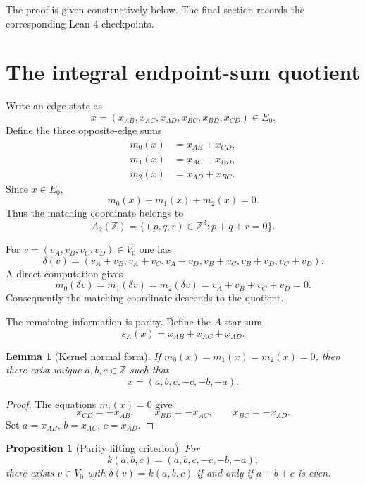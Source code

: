 \documentclass[11pt]{amsart}
\newtheorem{proposition}[theorem]{Proposition}
\newtheorem{lemma}[theorem]{Lemma}
\theoremstyle{definition}
\theoremstyle{remark}
\newcommand{\Z}{\mathbb Z}
\begin{document}
The proof is given constructively below. The final section records the corresponding Lean 4 checkpoints.

\section{The integral endpoint-sum quotient}

Write an edge state as
\[
x=(x_{AB},x_{AC},x_{AD},x_{BC},x_{BD},x_{CD})\in E_0.
\]
Define the three opposite-edge sums
\begin{equation}\label{eq:matching}
\begin{aligned}
m_0(x)&=x_{AB}+x_{CD},\\
m_1(x)&=x_{AC}+x_{BD},\\
m_2(x)&=x_{AD}+x_{BC}.
\end{aligned}
\end{equation}
Since $x\in E_0$,
\begin{equation}\label{eq:a2sum}
m_0(x)+m_1(x)+m_2(x)=0.
\end{equation}
Thus the matching coordinate belongs to
\[
A_2(\Z)=\{(p,q,r)\in\Z^3:p+q+r=0\}.
\]

For $v=(v_A,v_B,v_C,v_D)\in V_0$ one has
\[
\delta(v)=(v_A+v_B,v_A+v_C,v_A+v_D,v_B+v_C,v_B+v_D,v_C+v_D).
\]
A direct computation gives
\begin{equation}\label{eq:deltaMatching}
m_0(\delta v)=m_1(\delta v)=m_2(\delta v)=v_A+v_B+v_C+v_D=0.
\end{equation}
Consequently the matching coordinate descends to the quotient.

The remaining information is parity. Define the $A$-star sum
\[
s_A(x)=x_{AB}+x_{AC}+x_{AD}.
\]

\begin{lemma}[Kernel normal form]\label{lem:kernel-normal}
If $m_0(x)=m_1(x)=m_2(x)=0$, then there exist unique $a,b,c\in\Z$ such that
\[
x=(a,b,c,-c,-b,-a).
\]
\end{lemma}

\begin{proof}
The equations $m_i(x)=0$ give
\[
x_{CD}=-x_{AB},\qquad x_{BD}=-x_{AC},\qquad x_{BC}=-x_{AD}.
\]
Set $a=x_{AB}$, $b=x_{AC}$, $c=x_{AD}$.
\end{proof}

\begin{proposition}[Parity lifting criterion]\label{prop:parity}
For
\[
k(a,b,c)=(a,b,c,-c,-b,-a),
\]
there exists $v\in V_0$ with $\delta(v)=k(a,b,c)$ if and only if $a+b+c$ is even.
\end{proposition}
\end{document}
